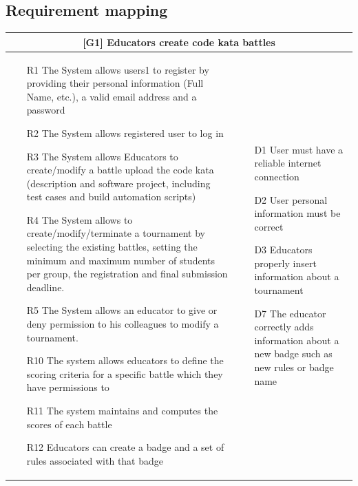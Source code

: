 \subsection{Requirement mapping}
\begin{tabular}{|p{7cm}|p{7cm}|}
\hline
\multicolumn{2}{|c|}{
\textbf{[G1] Educators create code kata battles} }
\\
\hline
\begin{itemize} 
\item [R1] The System allows users1 to register by providing their personal information (Full Name, etc.), a valid email address and a password
\item [R2] The System allows registered user to log in
\item [R3] The System allows Educators to create/modify a battle upload the code kata (description and software project, including test cases and build automation scripts)
\item [R4] The System allows to create/modify/terminate a tournament by selecting the existing battles, setting the minimum and maximum number of students per group, the registration and final submission deadline.
\item [R5] The System allows an educator to give or deny permission to his colleagues to modify a tournament.
\item [R10] The system allows educators to define the scoring criteria for a specific battle which they have permissions to
\item [R11] The system maintains and computes the scores of each battle
\item [R12] Educators can create a badge and a set of rules associated with that badge
\end{itemize}
&
\begin{itemize}
    \item [D1] User must have a reliable internet connection
    \item [D2] User personal information must be correct
    \item [D3] Educators properly insert information about a tournament
    \item [D7] The educator correctly adds information about a new badge such as new rules or badge name
\end{itemize}
\\
\hline
\end{tabular}

\pagebreak

